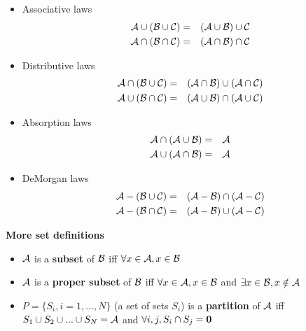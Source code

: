 \documentclass[justified, sixbynine]{tufte-book}
\def\subsubsection#1{{\bf #1}}
\theoremstyle{plain}%
\newtheorem * {corollary}{Corollary}
\theoremstyle{definition}
\theoremstyle{remark}
\newtheorem * {remark}{Remark}
\newtheorem * {note}{Note}
\begin{document}
\begin{fullwidth}
\begin{itemize}
\item  Associative laws
\begin{eqnarray}
{\cal A}\cup ({\cal B}\cup {\cal C}) &=&({\cal A}\cup {\cal B})\cup {\cal C}
\\
{\cal A}\cap ({\cal B\cap C}) &=&({\cal A\cap B})\cap {\cal C}
\end{eqnarray}

\item  Distributive laws
\begin{eqnarray}
{\cal A}\cap ({\cal B}\cup {\cal C}) &=&({\cal A}\cap {\cal B})\cup ({\cal A}%
\cap {\cal C}) \\
{\cal A}\cup ({\cal B}\cap {\cal C}) &=&({\cal A}\cup {\cal B})\cap ({\cal A}%
\cup {\cal C})
\end{eqnarray}

\item  Absorption laws
\begin{eqnarray}
{\cal A}\cap ({\cal A}\cup {\cal B}) &=&{\cal A} \\
{\cal A}\cup ({\cal A}\cap {\cal B}) &=&{\cal A}
\end{eqnarray}

\item  DeMorgan laws
\begin{eqnarray}
{\cal A}-({\cal B}\cup {\cal C}) &=&({\cal A}-{\cal B})\cap ({\cal A}-{\cal C%
}) \\
{\cal A}-({\cal B}\cap {\cal C}) &=&({\cal A}-{\cal B})\cup ({\cal A}-{\cal C%
})
\end{eqnarray}
\end{itemize}

\subsubsection{More set definitions}

\begin{itemize}
\item  ${\cal A}$ is a {\bf subset} of ${\cal B}$ iff $\forall x\in {\cal A}%
, x\in {\cal B}$

\item  ${\cal A}$ is a {\bf proper subset} of ${\cal B}$ iff $\forall x\in
{\cal A}, x\in {\cal B}$ and $\exists x\in {\cal B}, x\notin {\cal A}$

\item  $P=\{S_i, i=1, ..., N\}$ (a set of sets $S_i$) is a {\bf partition} of $%
{\cal A}$ iff $S_1\cup S_2\cup ...\cup S_N={\cal A}$ and $\forall
i, j, S_i\cap S_j={\bf 0}$


\end{itemize}
\end{fullwidth}
\end{document}
